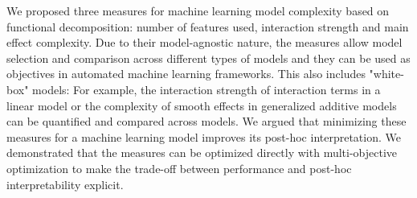 \documentclass[runningheads]{llncs}\usepackage[]{graphicx}\usepackage[]{color}
\begin{document}
We proposed three measures for machine learning model complexity based on functional decomposition: number of features used, interaction strength and main effect complexity.
Due to their model-agnostic nature, the measures allow model selection and comparison across different types of models and they can be used as objectives in automated machine learning frameworks.
This also includes "white-box" models:
For example, the interaction strength of interaction terms in a linear model or the complexity of smooth effects in generalized additive models can be quantified and compared across models.
We argued that minimizing these measures for a machine learning model improves its post-hoc interpretation.
We demonstrated that the measures can be optimized directly with multi-objective optimization to make the trade-off between performance and post-hoc interpretability explicit.
\end{document}
